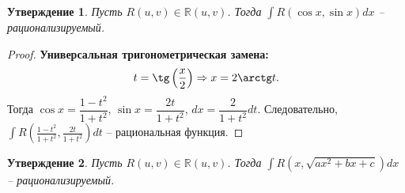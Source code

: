 \documentclass{article}
\theoremstyle{plain}
\newtheorem{claim}{Утверждение}
\theoremstyle{definition}
\theoremstyle{remark}
\begin{document}
\begin{claim}
Пусть $R(u, v) \in\mathbb{R}(u, v)$. Тогда $\int R(\cos x, \sin x)dx$ -- рационализируемый.
\end{claim}

\begin{proof}
\textbf{Универсальная тригонометрическая замена:}
$$t=\tg\left(\frac{x}{2}\right)\Rightarrow x=2\arctg t.$$
Тогда $\cos x = \dfrac{1-t^2}{1+t^2}$, $\sin x =\dfrac{2t}{1+t^2}$, $dx = \dfrac{2}{1+t^2}dt$. Следовательно,  $\displaystyle \int R\left(\frac{1-t^2}{1+t^2}, \frac{2t}{1+t^2}\right)dt$ -- рациональная функция.
\end{proof}

\begin{claim}\label{cl:eulersubst}
Пусть $R(u, v) \in\mathbb{R}(u, v)$. Тогда $\int R(x, \sqrt{ax^2+bx+c})dx$ -- рационализируемый.
\end{claim}
\end{document}
